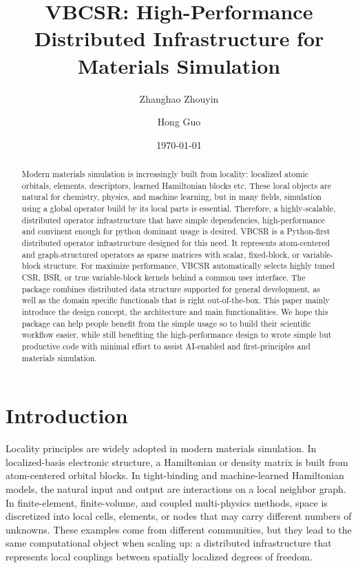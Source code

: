 \documentclass[
reprint,
superscriptaddress,
frontmatterverbose,
amsmath,amssymb,
pra,
]{revtex4-2}
\begin{document}
\title{VBCSR: High-Performance Distributed Infrastructure for Materials Simulation}

\author{Zhanghao Zhouyin}

\author{Hong Guo}

\date{\today}

\begin{abstract}
Modern materials simulation is increasingly built from locality: localized atomic orbitals, elements, descriptors, learned Hamiltonian blocks etc.  These local objects are natural for chemistry, physics, and machine learning, but in many fields, simulation using a global operator build by its local parts is essential. Therefore, a highly-scalable, distributed operator infrastructure that have simple dependencies, high-performance and convinent enough for python dominant usage is desired. VBCSR is a Python-first distributed operator infrastructure designed for this need.  It represents atom-centered and graph-structured operators as sparse matrices with scalar, fixed-block, or variable-block structure. For maximize performance, VBCSR automatically selects highly tuned CSR, BSR, or true variable-block kernels behind a common user interface.  The package combines distributed data structure supported for general development, as well as the domain specific functionals that is right out-of-the-box. This paper mainly introduce the design concept, the architecture and main functionalities. We hope this package can help people benefit from the simple usage so to build their scientific workflow easier, while still benefiting the high-performance design to wrote simple but productive code with minimal effort to assist AI-enabled and first-principles and materials simulation.
\end{abstract}

\maketitle

\section{Introduction}

Locality principles are widely adopted in modern materials simulation.  In localized-basis electronic structure, a Hamiltonian or density matrix is built from atom-centered orbital blocks.  In tight-binding and machine-learned Hamiltonian models, the natural input and output are interactions on a local neighbor graph.  In finite-element, finite-volume, and coupled multi-physics methods, space is discretized into local cells, elements, or nodes that may carry different numbers of unknowns.  These examples come from different communities, but they lead to the same computational object when scaling up: a distributed infrastructure that represents local couplings between spatially localized degrees of freedom.
\end{document}
